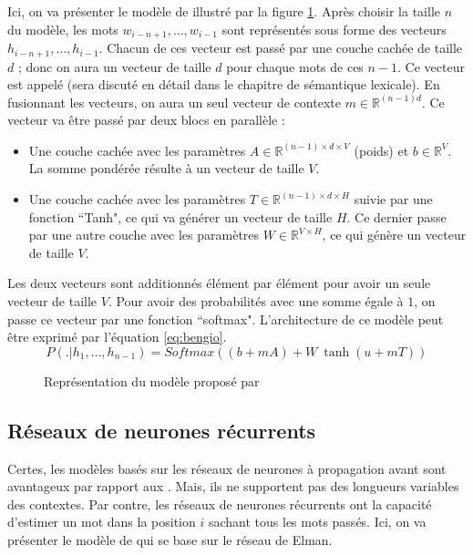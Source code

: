 \documentclass{KodeBook}
\begin{document}
Ici, on va présenter le modèle de \citet{2003-bengio-al} illustré par la figure \ref{fig:bengio-l}.
Après choisir la taille $n$ du modèle, les mots $w_{i-n+1}, \ldots, w_{i-1}$ sont représentés sous forme des vecteurs  $h_{i-n+1}, \ldots, h_{i-1}$. 
Chacun de ces vecteur est passé par une couche cachée de taille $d$ ; donc on aura un vecteur de taille $d$ pour chaque mots de ces $n-1$.
Ce vecteur est appelé  (sera discuté en détail dans le chapitre de sémantique lexicale). 
En fusionnant les vecteurs, on aura un seul vecteur de contexte $m \in \mathbb{R}^{(n-1) d}$.
Ce vecteur va être passé par deux blocs en parallèle :
\begin{itemize}
	\item Une couche cachée avec les paramètres $A \in \mathbb{R}^{(n-1) \times d \times V}$ (poids) et $b \in \mathbb{R}^{V}$. 
	La somme pondérée résulte à un vecteur de taille $V$. 
	\item Une couche cachée avec les paramètres $T \in \mathbb{R}^{(n-1) \times d \times H}$ suivie par une fonction ``Tanh", ce qui va générer un vecteur de taille $H$. 
	Ce dernier passe par une autre couche avec les paramètres $W \in \mathbb{R}^{V \times H}$, ce qui génère un vecteur de taille $V$. 
\end{itemize}
Les deux vecteurs sont additionnés élément par élément pour avoir un seule vecteur de taille $V$. 
Pour avoir des probabilités avec une somme égale à $1$, on passe ce vecteur par une fonction ``softmax". 
L'architecture de ce modèle peut être exprimé par l'équation \ref{eq:bengio}.
\begin{equation}
	P(.|h_1,\ldots, h_{n-1}) = 
	Softmax \left(
	(b + m A) 
	+ 
	W\ \tanh(u + m T)
	\right)
	\label{eq:bengio}
\end{equation}

\begin{figure}[ht]
	\centering
	\caption[Modèle de langage à base des réseaux de neurones à propagation avant]{Représentation du modèle proposé par \citet{2003-bengio-al}\label{fig:bengio-l}}
\end{figure}

\subsection{Réseaux de neurones récurrents}

Certes, les modèles basés sur les réseaux de neurones à propagation avant sont avantageux par rapport aux .
Mais, ils ne supportent pas des longueurs variables des contextes.
Par contre, les réseaux de neurones récurrents ont la capacité d'estimer un mot dans la position $i$ sachant tous les mots passés.
Ici, on va présenter le modèle de \citet{2010-mokolov-al} qui se base sur le réseau de Elman.
\end{document}
